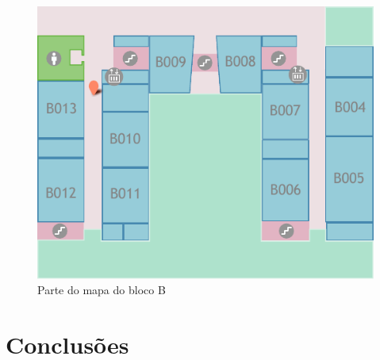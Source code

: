 \documentclass[twocolumn,twoside,11pt]{article}
\begin{document}
  \begin{figure}[width=\textwidth]
    \begin{center}
      \includegraphics{map.pdf}
    \end{center}
    \caption{Parte do mapa do bloco B}
    \label{fig:map}
  \end{figure}






\section{Conclusões}\label{sec:conclusions}

\lipsum[8]


\renewcommand{\bibname}{Referências}
%
%

%


\end{document}
